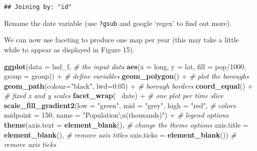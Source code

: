 \documentclass[]{article}
\newenvironment{Shaded}{}{}
\newcommand{\KeywordTok}[1]{\textcolor[rgb]{0.00,0.44,0.13}{\textbf{{#1}}}}
\newcommand{\DataTypeTok}[1]{\textcolor[rgb]{0.56,0.13,0.00}{{#1}}}
\newcommand{\DecValTok}[1]{\textcolor[rgb]{0.25,0.63,0.44}{{#1}}}
\newcommand{\FloatTok}[1]{\textcolor[rgb]{0.25,0.63,0.44}{{#1}}}
\newcommand{\CharTok}[1]{\textcolor[rgb]{0.25,0.44,0.63}{{#1}}}
\newcommand{\StringTok}[1]{\textcolor[rgb]{0.25,0.44,0.63}{{#1}}}
\newcommand{\CommentTok}[1]{\textcolor[rgb]{0.38,0.63,0.69}{\textit{{#1}}}}
\newcommand{\NormalTok}[1]{{#1}}
\begin{document}
\begin{verbatim}
## Joining by: "id"
\end{verbatim}

Rename the date variable (use \texttt{?gsub} and google `regex' to find
out more).

\begin{Shaded}
\end{Shaded}

We can now use faceting to produce one map per year (this may take a
little while to appear as displayed in Figure 15).

\begin{Shaded}
\begin{Highlighting}[]
\KeywordTok{ggplot}\NormalTok{(}\DataTypeTok{data =} \NormalTok{lnd_f, }\CommentTok{# the input data}
  \KeywordTok{aes}\NormalTok{(}\DataTypeTok{x =} \NormalTok{long, }\DataTypeTok{y =} \NormalTok{lat, }\DataTypeTok{fill =} \NormalTok{pop/}\DecValTok{1000}\NormalTok{, }\DataTypeTok{group =} \NormalTok{group)) +}\StringTok{ }\CommentTok{# define variables}
\StringTok{  }\KeywordTok{geom_polygon}\NormalTok{() +}\StringTok{ }\CommentTok{# plot the boroughs}
\StringTok{  }\KeywordTok{geom_path}\NormalTok{(}\DataTypeTok{colour=}\StringTok{"black"}\NormalTok{, }\DataTypeTok{lwd=}\FloatTok{0.05}\NormalTok{) +}\StringTok{ }\CommentTok{# borough borders}
\StringTok{  }\KeywordTok{coord_equal}\NormalTok{() +}\StringTok{ }\CommentTok{# fixed x and y scales}
\StringTok{  }\KeywordTok{facet_wrap}\NormalTok{(~}\StringTok{ }\NormalTok{date) +}\StringTok{ }\CommentTok{# one plot per time slice}
\StringTok{  }\KeywordTok{scale_fill_gradient2}\NormalTok{(}\DataTypeTok{low =} \StringTok{"green"}\NormalTok{, }\DataTypeTok{mid =} \StringTok{"grey"}\NormalTok{, }\DataTypeTok{high =} \StringTok{"red"}\NormalTok{, }\CommentTok{# colors}
    \DataTypeTok{midpoint =} \DecValTok{150}\NormalTok{, }\DataTypeTok{name =} \StringTok{"Population}\CharTok{\textbackslash{}n}\StringTok{(thousands)"}\NormalTok{) +}\StringTok{ }\CommentTok{# legend options}
\StringTok{  }\KeywordTok{theme}\NormalTok{(}\DataTypeTok{axis.text =} \KeywordTok{element_blank}\NormalTok{(), }\CommentTok{# change the theme options}
    \DataTypeTok{axis.title =} \KeywordTok{element_blank}\NormalTok{(), }\CommentTok{# remove axis titles}
    \DataTypeTok{axis.ticks =} \KeywordTok{element_blank}\NormalTok{()) }\CommentTok{# remove axis ticks}
\end{Highlighting}
\end{Shaded}
\end{document}
